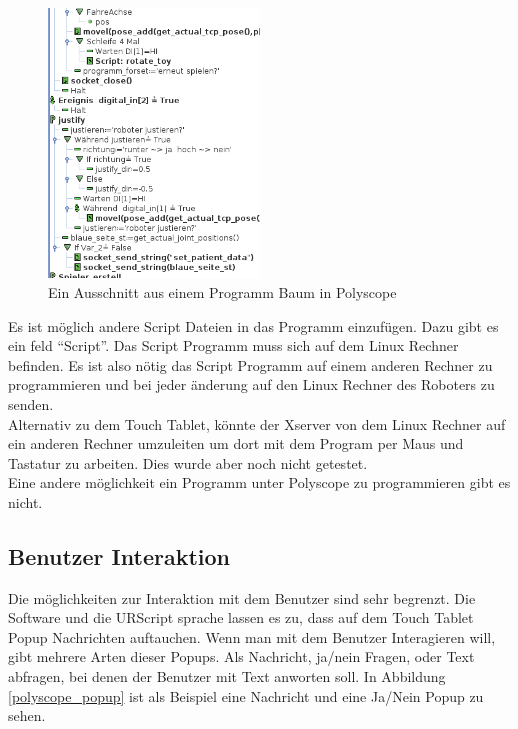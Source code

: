 \begin{figure}[ht]
  \centering
    \includegraphics[width=0.5\textwidth]{pic/polyscope_program_tree.png}
      \caption[Programm Baum in Polyscope]{Ein Ausschnitt aus einem Programm Baum in Polyscope}
      \label{fig:programm_in_polyscope}
\end{figure}

Es ist möglich andere Script Dateien in das Programm einzufügen. Dazu gibt es ein feld ``Script''. Das Script Programm muss sich auf dem Linux Rechner befinden. Es ist also nötig das Script Programm auf einem anderen Rechner zu programmieren und bei jeder änderung auf den Linux Rechner des Roboters zu senden.
\\
Alternativ zu dem Touch Tablet, könnte der Xserver von dem Linux Rechner auf ein anderen Rechner umzuleiten um dort mit dem Program per Maus und Tastatur zu arbeiten. Dies wurde aber noch nicht getestet.
\\
Eine andere möglichkeit ein Programm unter Polyscope zu programmieren gibt es nicht.

\subsection{Benutzer Interaktion}
\label{user_interaktion_polyscope_rel}

Die möglichkeiten zur Interaktion mit dem Benutzer sind sehr begrenzt. Die Software und die URScript sprache lassen es zu, dass auf dem Touch Tablet Popup Nachrichten auftauchen. Wenn man mit dem Benutzer Interagieren will, gibt mehrere Arten dieser Popups.
Als Nachricht, ja/nein Fragen, oder Text abfragen, bei denen der Benutzer mit Text anworten soll. In Abbildung \ref{polyscope_popup} 
ist als Beispiel eine Nachricht und eine Ja/Nein Popup zu sehen.

